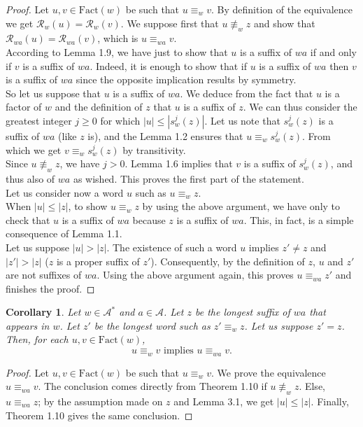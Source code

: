 \documentclass[11pt]{report}
\newtheorem{corollary}[theorem]{Corollary}
\begin{document}
\begin{proof}
  Let $u, v \in \text{Fact}(w)$ be such that $u \equiv_w v$. By
  definition of the equivalence we get $\mathcal{R}_w(u) =
  \mathcal{R}_w(v)$. We suppose first that $u \not\equiv_w z$ and show
  that $\mathcal{R}_{wa}(u) = \mathcal{R}_{wa}(v)$, which is $u
  \equiv_{wa} v$.\\
According to Lemma 1.9, we have just to show that $u$ is a suffix of
$wa$ if and only if $v$ is a suffix of $wa$. Indeed, it is enough to
show that if $u$ is a suffix of $wa$ then $v$ is a suffix of $wa$
since the opposite implication results by symmetry.\\
So let us suppose that $u$ is a suffix of $wa$. We deduce from the
fact that $u$ is a factor of $w$ and the definition of $z$ that $u$ is
a suffix of $z$. We can thus consider the greatest integer $j \ge 0$
for which $|u| \le |s_{w}^j(z)|$. Let us note that $s_{w}^j(z)$ is a
suffix of $wa$ (like $z$ is), and the Lemma 1.2 ensures that $u
\equiv_w s_{w}^j(z)$. From which we get $v \equiv_w s_{w}^j(z)$ by
transitivity.\\
Since $u \not\equiv_w z$, we have $j > 0$. Lemma 1.6 implies that $v$
is a suffix of $s_{w}^j(z)$, and thus also of $wa$ as wished. This
proves the first part of the statement.\\
Let us consider now a word $u$ such as $u \equiv_w z$.\\
When $|u| \le |z|$, to show $u \equiv_w z$ by using the above
argument, we have only to check that $u$ is a suffix of $wa$ because
$z$ is a suffix of $wa$. This, in fact, is a simple consequence of
Lemma 1.1.\\
Let us suppose $|u| > |z|$. The existence of such a word $u$ implies
$z' \not= z$ and $|z'| > |z|$ ($z$ is a proper suffix of
$z'$). Consequently, by the definition of $z$, $u$ and $z'$ are not
suffixes of $wa$. Using the above argument again, this proves $u
\equiv_{wa} z'$ and finishes the proof.
\end{proof}
\begin{corollary}
  Let $w \in \mathcal{A}^*$ and $a \in \mathcal{A}$. Let $z$ be the
  longest suffix of $wa$ that appears in $w$. Let $z'$ be the longest
  word such as $z' \equiv_w z$. Let us suppose $z' = z$. Then, for
  each $u, v \in \text{Fact}(w)$, $$u \equiv_w v \text{ implies } u
  \equiv_{wa} v.$$
\end{corollary}
\begin{proof}
  Let $u, v \in \text{Fact}(w)$ be such that $u \equiv_w v$. We prove
  the equivalence $u \equiv_{wa} v$. The conclusion comes directly
  from Theorem 1.10 if $u \not\equiv_w z$. Else, $u \equiv_{wa} z$; by
  the assumption made on $z$ and Lemma 3.1, we get $|u| \le
  |z|$. Finally, Theorem 1.10 gives the same conclusion.
\end{proof}
\end{document}
